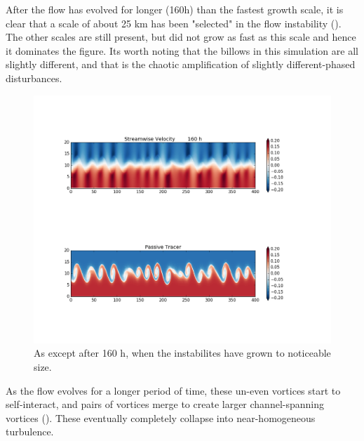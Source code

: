 \documentclass[11pt]{article}
\begin{document}
After the flow has evolved for longer (160h) than the fastest growth scale, it
is clear that a scale of about 25 km has been "selected" in the flow
instability ().  The other scales are still present, but
did not grow as fast as this scale and hence it dominates the figure.  Its
worth noting that the billows in this simulation are all slightly different,
and that is the chaotic amplification of slightly different-phased
disturbances.  

\begin{figure}[hbtp]
  \begin{center}
\includegraphics[width=5in]{images/ChanPar040000576000}
  \end{center}
  \caption{As  except after 160 h, when the instabilites
have grown to noticeable size.}
  \label{fig:ChanPar02}
\end{figure}

\clearpage

As the flow evolves for a longer period of time, these un-even vortices start
to self-interact, and pairs of vortices merge to create larger channel-spanning
vortices ().  These eventually completely collapse into
near-homogeneous turbulence.
\end{document}
